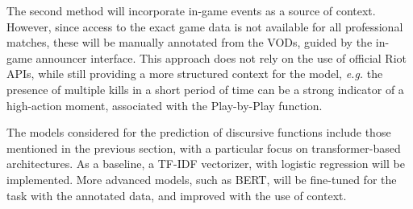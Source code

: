 \medskip

The second method will incorporate in-game events as a source of context. However, since access to the exact game data is not available for all professional matches, these will be manually annotated from the VODs, guided by the in-game announcer interface. This approach does not rely on the use of official Riot APIs, while still providing a more structured context for the model, \textit{e.g.} the presence of multiple kills in a short period of time can be a strong indicator of a high-action moment, associated with the Play-by-Play function.

\medskip

The models considered for the prediction of discursive functions include those mentioned in the previous section, with a particular focus on transformer-based architectures. As a baseline, a TF-IDF vectorizer, with logistic regression will be implemented. More advanced models, such as BERT, will be fine-tuned for the task with the annotated data, and improved with the use of context. 


